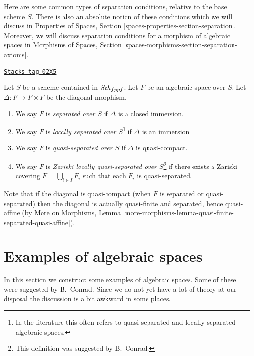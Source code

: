 Here are some common types of separation conditions, relative to the base
scheme $S$. There is also an absolute notion of these conditions which we
will discuss in
Properties of Spaces, Section \ref{spaces-properties-section-separation}.
Moreover, we will discuss separation conditions for a morphism of
algebraic spaces in
Morphisms of Spaces, Section \ref{spaces-morphisms-section-separation-axioms}.

\begin{definition}[Separated]
\label{spaces-definition-separated}
\href{https://stacks.math.columbia.edu/tag/02X5}{\texttt{Stacks tag 02X5}}

Let $S$ be a scheme contained in $\mathit{Sch}_{fppf}$.
Let $F$ be an algebraic space over $S$.
Let $\Delta : F \to F \times F$ be the diagonal morphism.
\begin{enumerate}
\item We say $F$ is {\it separated over $S$} if $\Delta$ is a closed immersion.
\item We say $F$ is {\it locally separated over $S$}\footnote{In the
literature this often refers to quasi-separated and
locally separated algebraic spaces.} if $\Delta$ is an
immersion.
\item We say $F$ is {\it quasi-separated over $S$} if $\Delta$ is quasi-compact.
\item We say $F$ is {\it Zariski locally quasi-separated over $S$}\footnote{This
definition was suggested by B.\ Conrad.} if there
exists a Zariski covering $F = \bigcup_{i \in I} F_i$ such that
each $F_i$ is quasi-separated.
\end{enumerate}
\end{definition}

Note that if the diagonal is quasi-compact (when $F$ is separated or
quasi-separated) then the diagonal is actually
quasi-finite and separated, hence quasi-affine (by More on Morphisms,
Lemma \ref{more-morphisms-lemma-quasi-finite-separated-quasi-affine}).

\section{Examples of algebraic spaces}
\label{spaces-section-examples}
In this section we construct some examples of algebraic spaces.
Some of these were suggested by B.\ Conrad.
Since we do not yet have a lot of theory at our disposal the
discussion is a bit awkward in some places.

